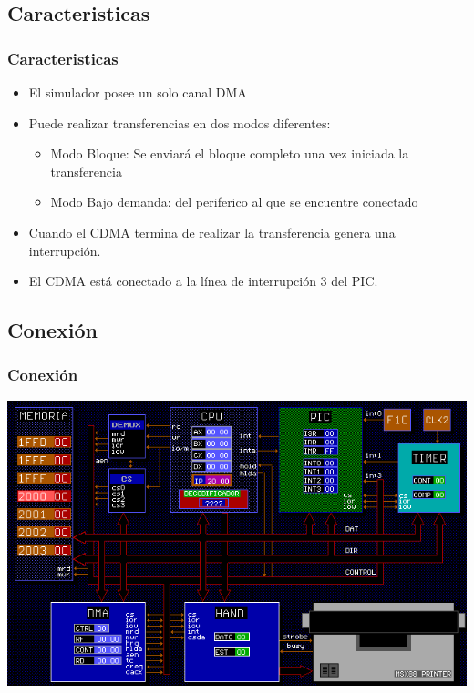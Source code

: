 \documentclass{beamer}
\begin{document}
\subsection{Caracteristicas}
\begin{frame}
\frametitle{Caracteristicas}
\begin{itemize}
  \item El simulador posee un solo canal DMA
  \item Puede realizar transferencias en dos modos diferentes:
\begin{itemize}
  \item Modo Bloque: Se enviará el bloque completo una vez iniciada la transferencia
  \item Modo Bajo demanda: del periferico al que se encuentre conectado
\end{itemize}
  \item Cuando el CDMA termina de realizar la transferencia genera una interrupción.
  \item El CDMA está conectado a la línea de interrupción 3 del PIC.
\end{itemize}
\end{frame}

\subsection{Conexión}
\begin{frame}
\frametitle{Conexión}
\includegraphics[scale=0.45]{conf3.png}
\end{frame}
\end{document}
